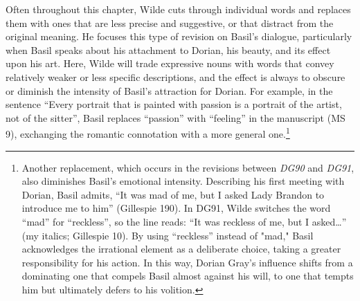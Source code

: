 \documentclass[11pt]{article}
\begin{document}
Often throughout this chapter, Wilde cuts through individual words and
replaces them with ones that are less precise and suggestive, or that
distract from the original meaning. He focuses this type of revision
on Basil’s dialogue, particularly when Basil speaks about his
attachment to Dorian, his beauty, and its effect upon his art. Here,
Wilde will trade expressive nouns with words that convey relatively
weaker or less specific descriptions, and the effect is always to
obscure or diminish the intensity of Basil’s attraction for
Dorian. For example, in the sentence “Every portrait that is painted
with passion is a portrait of the artist, not of the sitter”, Basil
replaces “passion” with “feeling” in the manuscript (MS 9), exchanging
the romantic connotation with a more general one.\footnote{Another replacement, which occurs in the revisions between
\emph{DG90} and \emph{DG91}, also diminishes Basil’s emotional
intensity. Describing his first meeting with Dorian, Basil admits, “It
was mad of me, but I asked Lady Brandon to introduce me to him”
(Gillespie 190). In DG91, Wilde switches the word “mad” for
“reckless”, so the line reads: “It was reckless of me, but I asked\ldots{}”
(my italics; Gillespie 10). By using “reckless” instead of "mad,"
Basil acknowledges the irrational element as a deliberate choice,
taking a greater responsibility for his action. In this way, Dorian
Gray’s influence shifts from a dominating one that compels Basil
almost against his will, to one that tempts him but ultimately defers
to his volition.}
\end{document}
